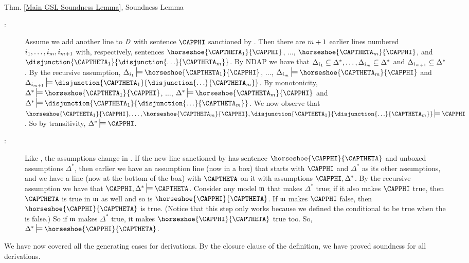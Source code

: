 \begin{PROOFOF}{Thm. \ref{Main GSL Soundness Lemma}, Soundness Lemma}
\begin{description}
\begin{description}
\item[:]
Assume we add another line to $\mathit{D}$ with sentence $\CAPPHI$ sanctioned by .
Then there are $m+1$ earlier lines numbered $i_{1},\ldots,i_{m},i_{m+1}$ with, respectively, sentences $\horseshoe{\CAPTHETA_1}{\CAPPHI}$, $\ldots$, $\horseshoe{\CAPTHETA_{\integer{m}}}{\CAPPHI}$, and  $\disjunction{\CAPTHETA_1}{\disjunction{\ldots}{\CAPTHETA_{\integer{m}}}}$.
By NDAP we have that $\Delta_{i_1}\subseteq\Delta^*,\ldots,\Delta_{i_m}\subseteq\Delta^*$ and $\Delta_{i_{m+1}}\subseteq\Delta^*$.
By the recursive assumption, $\Delta_{\integer{i}_1}\sdtstile{}{}\horseshoe{\CAPTHETA_1}{\CAPPHI}$, $\ldots$, $\Delta_{\integer{i}_\integer{m}}\sdtstile{}{}\horseshoe{\CAPTHETA_{\integer{m}}}{\CAPPHI}$ and $\Delta_{\integer{i}_{\integer{m}+1}}\sdtstile{}{}\disjunction{\CAPTHETA_1}{\disjunction{\ldots}{\CAPTHETA_{\integer{m}}}}$.
By monotonicity, $\Delta^*\sdtstile{}{}\horseshoe{\CAPTHETA_1}{\CAPPHI}$, $\ldots$, $\Delta^*\sdtstile{}{}\horseshoe{\CAPTHETA_{\integer{m}}}{\CAPPHI}$ and $\Delta^*\sdtstile{}{}\disjunction{\CAPTHETA_1}{\disjunction{\ldots}{\CAPTHETA_{\integer{m}}}}$.
We now observe that $\horseshoe{\CAPTHETA_1}{\CAPPHI},\ldots,\horseshoe{\CAPTHETA_{\integer{m}}}{\CAPPHI},\disjunction{\CAPTHETA_1}{\disjunction{\ldots}{\CAPTHETA_{\integer{m}}}}\sdtstile{}{}\CAPPHI$.
So by transitivity, $\Delta^*\sdtstile{}{}\CAPPHI$.

\item[:]
Like , the assumptions change in . 
If the new line sanctioned by  has sentence $\horseshoe{\CAPPHI}{\CAPTHETA}$ and unboxed assumptions $\Delta^*$, then earlier we have an assumption line (now in a box) that starts with $\CAPPHI$ and $\Delta^*$ as its other assumptions, and we have a line (now at the bottom of the box) with $\CAPTHETA$ on it with assumptions $\CAPPHI,\Delta^*$. 
By the recursive assumption we have that $\CAPPHI,\Delta^*\sdtstile{}{}\CAPTHETA$. 
Consider any model $\mathfrak{m}{}$ that makes $\Delta^*$ true;
if it also makes $\CAPPHI$ true, then $\CAPTHETA$ is true in $\mathfrak{m}{}$ as well and so is $\horseshoe{\CAPPHI}{\CAPTHETA}$. 
If $\mathfrak{m}{}$ makes $\CAPPHI$ false, then $\horseshoe{\CAPPHI}{\CAPTHETA}$ is true. 
(Notice that this step only works because we defined the conditional to be true when the  is false.)
So if $\mathfrak{m}{}$ makes $\Delta^*$ true, it makes $\horseshoe{\CAPPHI}{\CAPTHETA}$ true too. 
So, $\Delta^*\sdtstile{}{}\horseshoe{\CAPPHI}{\CAPTHETA}$.  

\end{description}
\item[Closure Step:] We have now covered all the generating cases for derivations. By the closure clause of the definition, we have proved soundness for all derivations. 
\end{description}
\end{PROOFOF} 

